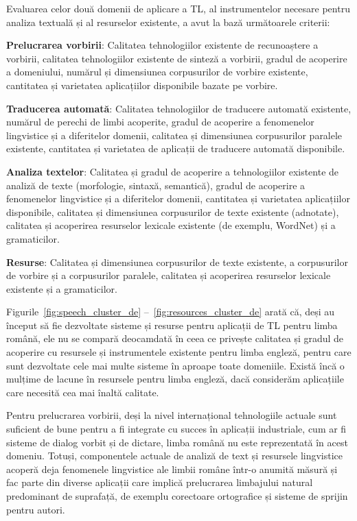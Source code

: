 \begin{multicols}{2}
Evaluarea celor două domenii de aplicare a TL, al instrumentelor necesare pentru analiza textuală și al resurselor existente, a avut la bază următoarele criterii:

\textbf{Prelucrarea vorbirii}: Calitatea tehnologiilor existente de recunoaștere a vorbirii, calitatea tehnologiilor existente de sinteză a vorbirii, gradul de acoperire a domeniului, numărul și dimensiunea corpusurilor de vorbire existente, cantitatea și varietatea aplicațiilor disponibile bazate pe vorbire.

\textbf{Traducerea automată}: Calitatea tehnologiilor de traducere automată existente, numărul de perechi de limbi acoperite, gradul de acoperire a fenomenelor lingvistice și a diferitelor domenii, calitatea și dimensiunea corpusurilor paralele existente, cantitatea și varietatea de aplicații de traducere automată disponibile.

\textbf{Analiza textelor}: Calitatea și gradul de acoperire a tehnologiilor existente de analiză de texte (morfologie, sintaxă, semantică), gradul de acoperire a fenomenelor lingvistice și a diferitelor domenii, cantitatea și varietatea aplicațiilor disponibile, calitatea și dimensiunea corpusurilor de texte existente (adnotate), calitatea și acoperirea resurselor lexicale existente (de exemplu, WordNet) și a gramaticilor.

\textbf{Resurse}: Calitatea și dimensiunea corpusurilor de texte existente, a corpusurilor de vorbire și a corpusurilor paralele, calitatea și acoperirea resurselor lexicale existente și a gramaticilor.

Figurile~\ref{fig:speech_cluster_de} --~\ref{fig:resources_cluster_de} arată că, deși au început să fie dezvoltate sisteme și resurse pentru aplicații de TL pentru limba română, ele nu se compară deocamdată în ceea ce privește calitatea și gradul de acoperire cu resursele și instrumentele existente pentru limba engleză, pentru care sunt dezvoltate cele mai multe sisteme în aproape toate domeniile. Există încă o mulțime de lacune în resursele pentru limba engleză, dacă considerăm aplicațiile care necesită cea mai înaltă calitate.

Pentru prelucrarea vorbirii, deși la nivel internațional tehnologiile actuale sunt suficient de bune pentru a fi integrate cu succes în aplicații industriale, cum ar fi sisteme de dialog vorbit și de dictare, limba română nu este reprezentată în acest domeniu. Totuși, componentele actuale de analiză de text și resursele lingvistice acoperă deja fenomenele lingvistice ale limbii române \mbox{într-o} anumită măsură și fac parte din diverse aplicații care implică prelucrarea limbajului natural predominant de suprafață, de exemplu corectoare ortografice și sisteme de sprijin pentru autori.


\end{multicols}
